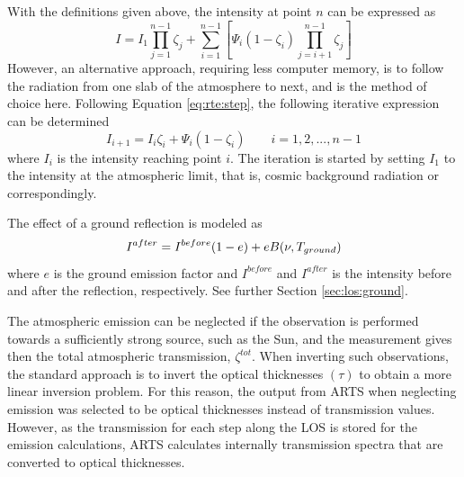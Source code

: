   \label{sec:rte:solving}
  
  With the definitions given above, the intensity at point $n$ can be
  expressed as
 \begin{equation}
   I = I_1 \prod_{j=1}^{n-1}\zeta_j + 
       \sum_{i=1}^{n-1}\left[\Psi_i(1-\zeta_i)\prod_{j=i+1}^{n-1}\zeta_j\right]
  \label{eq:rte:rteprod}
 \end{equation}
 However, an alternative approach, requiring less computer memory, is
 to follow the radiation from one slab of the atmosphere to next, and
 is the method of choice here. Following Equation \ref{eq:rte:step},
 the following iterative expression can be determined
 \citep{eriksson:97a}
 \begin{equation}
   I_{i+1} = I_i\zeta_i + \Psi_i\left(1-\zeta_i\right)\qquad i=1,2,...,n-1
  \label{eq:rte:iteration}
 \end{equation}
 where $I_i$ is the intensity reaching point $i$.
 The iteration is started by setting $I_1$ to the intensity at the 
 atmospheric limit, that is, cosmic background radiation or correspondingly.


  \label{sec:rte:ground}

 The effect of a ground reflection is modeled as
 \begin{equation}
   I^{after} = I^{before}(1-e) + eB(\nu,T_{ground})
  \label{eq:rte:ground}
 \end{equation} 
 where $e$ is the ground emission factor and $I^{before}$ and
 $I^{after}$ is the intensity before and after the reflection,
 respectively. See further Section \ref{sec:los:ground}.


 \label{sec:rte:trans}
  
 The atmospheric emission can be neglected if the observation is
 performed towards a sufficiently strong source, such as the Sun, and
 the measurement gives then the total atmospheric transmission,
 $\zeta^{tot}$. When inverting such observations, the standard
 approach is to invert the optical thicknesses $(\tau)$ to obtain a
 more linear inversion problem. For this reason, the output from
 ARTS when neglecting emission was selected to be optical thicknesses
 instead of transmission values. However, as the transmission for
 each step along the LOS is stored for the emission calculations, 
 ARTS calculates internally transmission spectra that are converted
 to optical thicknesses.

